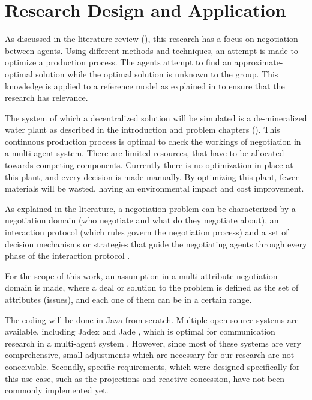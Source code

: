 \chapter{Research Design and Application}
\label{ch:design}
As discussed in the literature review  (), this research has a focus on negotiation between agents. Using different methods and techniques, an attempt is made to optimize a production process. The agents attempt to find an approximate-optimal solution while the optimal solution is unknown to the group. This knowledge is applied to a reference model as explained in  to ensure that the research has relevance.  %

The system of which a decentralized solution will be simulated is a de-mineralized water plant as described in the introduction and problem chapters (). This continuous production process is optimal to check the workings of negotiation in a multi-agent system. There are limited resources, that have to be allocated towards competing components. Currently there is no optimization in place at this plant, and every decision is made manually. By optimizing this plant, fewer materials will be wasted, having an environmental impact and cost improvement.

As explained in the literature, a negotiation problem can be characterized by a negotiation domain (who negotiate and what do they negotiate about), an interaction protocol (which rules govern the negotiation process) and a set of decision mechanisms or strategies that guide the negotiating agents through every phase of the interaction protocol \citep{fatima2014principles}.

For the scope of this work, an assumption in a multi-attribute negotiation domain is made, where a deal or solution to the problem is defined as the set of attributes (issues), and each one of them can be in a certain range.

The coding will be done in Java from scratch. Multiple open-source systems are available, including Jadex and Jade \citep{bellifemine2007developing}, which is optimal for communication research in a multi-agent system \citep{kravari2015survey}. However, since most of these systems are very comprehensive, small adjustments which are necessary for our research are not conceivable. Secondly, specific requirements, which were designed specifically for this use case, such as the projections and reactive concession, have not been commonly implemented yet. 

